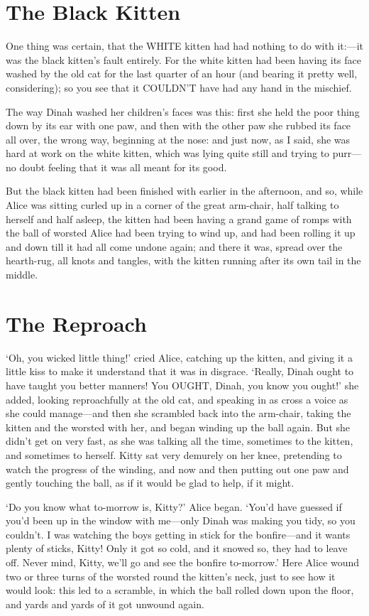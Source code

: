 \documentclass[phd,tocprelim,draft]{cornell}
\begin{document}
\section{The Black Kitten}
  One thing was certain, that the WHITE kitten had had nothing to
do with it:---it was the black kitten's fault entirely.  For the
white kitten had been having its face washed by the old cat for
the last quarter of an hour (and bearing it pretty well,
considering); so you see that it COULDN'T have had any hand in
the mischief.

  The way Dinah washed her children's faces was this:  first she
held the poor thing down by its ear with one paw, and then with
the other paw she rubbed its face all over, the wrong way,
beginning at the nose:  and just now, as I said, she was hard at
work on the white kitten, which was lying quite still and trying
to purr---no doubt feeling that it was all meant for its good.

  But the black kitten had been finished with earlier in the
afternoon, and so, while Alice was sitting curled up in a corner
of the great arm-chair, half talking to herself and half asleep,
the kitten had been having a grand game of romps with the ball of
worsted Alice had been trying to wind up, and had been rolling it
up and down till it had all come undone again; and there it was,
spread over the hearth-rug, all knots and tangles, with the
kitten running after its own tail in the middle.

\section{The Reproach}

  `Oh, you wicked little thing!' cried Alice, catching up the
kitten, and giving it a little kiss to make it understand that it
was in disgrace.  `Really, Dinah ought to have taught you better
manners!  You OUGHT, Dinah, you know you ought!' she added,
looking reproachfully at the old cat, and speaking in as cross a
voice as she could manage---and then she scrambled back into the
arm-chair, taking the kitten and the worsted with her, and began
winding up the ball again.  But she didn't get on very fast, as
she was talking all the time, sometimes to the kitten, and
sometimes to herself.  Kitty sat very demurely on her knee,
pretending to watch the progress of the winding, and now and then
putting out one paw and gently touching the ball, as if it would
be glad to help, if it might.

  `Do you know what to-morrow is, Kitty?' Alice began.  `You'd
have guessed if you'd been up in the window with me---only Dinah
was making you tidy, so you couldn't.  I was watching the boys
getting in stick for the bonfire---and it wants plenty of
sticks, Kitty!  Only it got so cold, and it snowed so, they had
to leave off.  Never mind, Kitty, we'll go and see the bonfire
to-morrow.'  Here Alice wound two or three turns of the worsted
round the kitten's neck, just to see how it would look:  this led
to a scramble, in which the ball rolled down upon the floor, and
yards and yards of it got unwound again.
\end{document}
